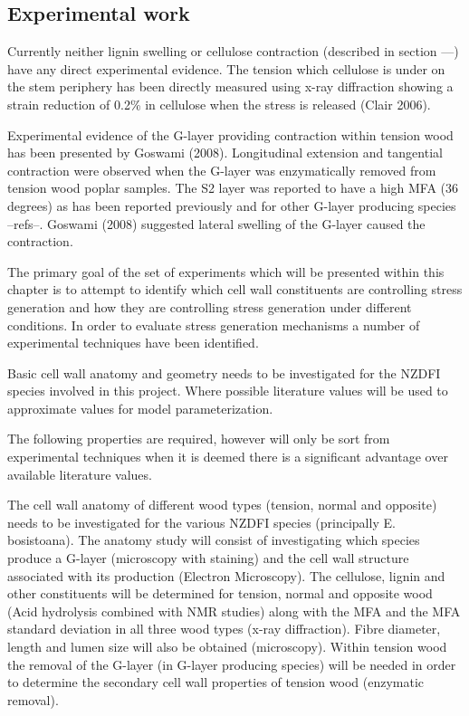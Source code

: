 \documentclass{article}
\begin{document}
\subsection{Experimental work}
Currently neither lignin swelling or cellulose contraction (described in section
---) have any direct experimental evidence. The tension which cellulose is under
on the stem periphery has been directly measured using x-ray diffraction showing
a strain reduction of 0.2\% in cellulose when the stress is released (Clair
2006).

Experimental evidence of the G-layer providing contraction within tension wood
has been presented by Goswami (2008). Longitudinal extension and tangential
contraction were observed when the G-layer was enzymatically removed from
tension wood poplar samples. The S2 layer was reported to have a high MFA (36
degrees) as has been reported previously and for other G-layer producing species
--refs--. Goswami (2008) suggested lateral swelling of the G-layer caused the
contraction.

The primary goal of the set of experiments which will be presented within this
chapter is to attempt to identify which cell wall constituents are controlling
stress generation and how they are controlling stress generation under different
conditions. In order to evaluate stress generation mechanisms a number of
experimental techniques have been identified.

Basic cell wall anatomy and geometry needs to be investigated for the NZDFI
species involved in this project. Where possible literature values will be used
to approximate values for model parameterization.

The following properties are required, however will only be sort from
experimental techniques when it is deemed there is a significant advantage over
available literature values.

The cell wall anatomy of different wood types (tension, normal and opposite)
needs to be investigated for the various NZDFI species (principally E.
bosistoana). The anatomy study will consist of investigating which species
produce a G-layer (microscopy with staining) and the cell wall structure
associated with its production (Electron Microscopy). The cellulose, lignin and
other constituents will be determined for tension, normal and opposite wood
(Acid hydrolysis combined with NMR studies) along with the MFA and the MFA
standard deviation in all three wood types (x-ray diffraction). Fibre diameter,
length and lumen size will also be obtained (microscopy). Within tension wood
the removal of the G-layer (in G-layer producing species) will be needed in
order to determine the secondary cell wall properties of tension wood (enzymatic
removal).
\end{document}

